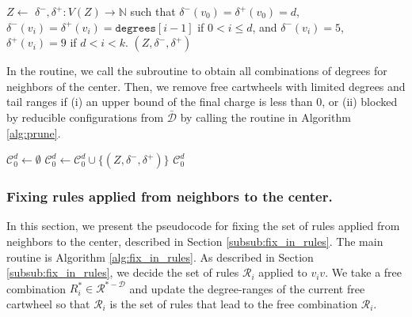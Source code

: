 \documentclass[main.tex]{subfiles}
\begin{document}
\begin{algorithm}[H]
\begin{algorithmic}[1]
        \State $Z \gets$  
        \State $\delta^-, \delta^+ \colon V(Z) \to \mathbb{N}$ such that
        $\delta^-(v_0)=\delta^+(v_0)=d$,
        $\delta^-(v_i)=\delta^+(v_i)=\texttt{degrees}[i-1]$ if $0 < i \leq d$, and
        $\delta^-(v_i)=5$, $\delta^+(v_i)=9$ if $d < i < k$.
        \State \Return $(Z, \delta^-, \delta^+)$
    \end{algorithmic}
\end{algorithm}

In the \enumPossibleBadWheels routine, we call the \enumWheels subroutine to obtain all combinations of degrees for neighbors of the center.
Then, we remove free cartwheels with limited degrees and tail ranges if (i) an upper bound of the final charge is less than 0, or (ii) blocked by reducible configurations from $\bar{\mathcal{D}}$ by calling the \prune routine in Algorithm \ref{alg:prune}.

\begin{algorithm}[H]
    \caption{\enumPossibleBadWheelsWithLink($d, \mathcal{R}, \mathcal{R}^{*-\mathcal{D}}, \bar{\mathcal{D}}$)}
    \label{alg:enum_possible_bad_wheels}
    \begin{algorithmic}[1]
        \State $\mathcal{C}^d_{0} \gets \emptyset$
             \Continue
             \EndIf
        \State $\mathcal{C}^d_0 \gets \mathcal{C}^d_0 \cup \{(Z, \delta^-, \delta^+)\}$
        \EndFor
        \State \Return $\mathcal{C}^d_0$
    \end{algorithmic}
\end{algorithm}

\subsubsection{Fixing rules applied from neighbors to the center.}
In this section, we present the pseudocode for fixing the set of rules applied from neighbors to the center, described in Section \ref{subsub:fix_in_rules}.
The main routine is Algorithm \ref{alg:fix_in_rules}.
As described in Section \ref{subsub:fix_in_rules}, we decide the set of rules $\mathcal{R}_i$ applied to $v_iv$.
We take a free combination $R_i^* \in \mathcal{R}^{*-\mathcal{D}}$ and update the degree-ranges of the current free cartwheel so that $\mathcal{R}_i$ is the set of rules that lead to the free combination $\mathcal{R}_i$.
\end{document}
